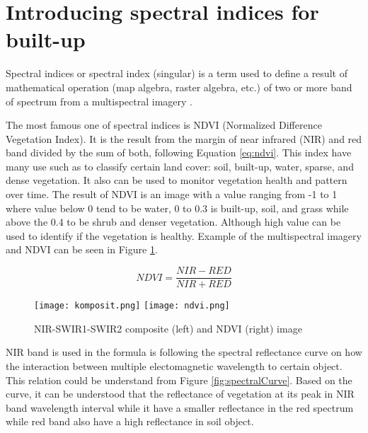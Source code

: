 \maketitle

\tableofcontents

\section{Introducing spectral indices for built-up}
Spectral indices or spectral index (singular) is a term used to define a result of mathematical operation (map algebra, raster algebra, etc.) of two or more band of spectrum from a multispectral imagery \cite{xue2017significant}.

 The most famous one of spectral indices is NDVI (Normalized Difference Vegetation Index). It is the result from the margin of near infrared (NIR) and red band divided by the sum of both, following Equation \ref{eq:ndvi}. This index have many use such as to classify certain land cover: soil, built-up, water, sparse, and dense vegetation. It also can be used to monitor vegetation health and pattern over time. The result of NDVI is an image with a value ranging from -1 to 1 where value below 0 tend to be water, 0 to 0.3 is built-up, soil, and grass while above the 0.4 to be shrub and denser vegetation. Although high value can be used to identify if the vegetation is healthy. Example of the multispectral imagery and NDVI can be seen in Figure \ref{fig:imageNdvi}.

\begin{equation}
	\label{eq:ndvi}
	NDVI = \frac{NIR - RED}{NIR + RED}
\end{equation}

\begin{figure}
	\label{fig:imageNdvi}
	\centering
	\texttt{[image: komposit.png]}
	\texttt{[image: ndvi.png]}
	\caption{NIR-SWIR1-SWIR2 composite (left) and NDVI (right) image}
\end{figure}

NIR band is used in the formula is following the spectral reflectance curve on how the interaction between multiple electomagnetic wavelength to certain object. This relation could be understand from Figure \ref{fig:spectralCurve}. Based on the curve, it can be understood that the reflectance of vegetation at its peak in NIR band wavelength interval while it have a smaller reflectance in the red spectrum while red band also have a high reflectance in soil object.

